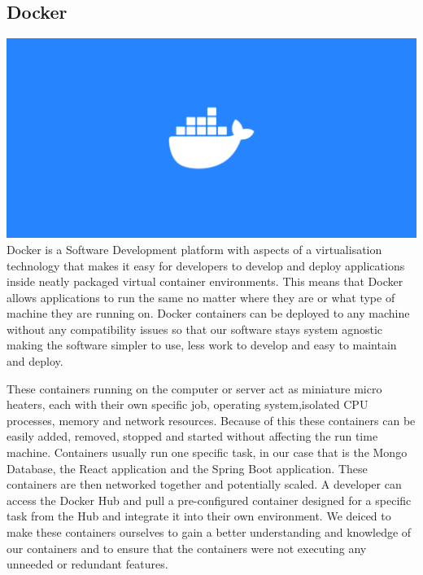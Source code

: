 \subsection{Docker}
\includegraphics[scale=0.2]{img/docker-logo.png} \newline
Docker is a Software Development platform with aspects of a virtualisation technology that makes it easy for developers to develop and deploy applications inside neatly packaged virtual container environments. This means that Docker allows applications to run the same no matter where they are or what type of machine they are running on. Docker containers can be deployed to any machine without any compatibility issues so that our software stays system agnostic making the software simpler to use, less work to develop and easy to maintain and deploy. \par
These containers running on the computer or server act as miniature micro heaters, each with their own specific job, operating system,isolated CPU processes, memory and network resources. Because of this these containers can be easily added, removed, stopped and started without affecting the run time machine. Containers usually run one specific task, in our case that is the Mongo Database, the React application and the Spring Boot application. These containers are then networked together and potentially scaled. A developer can access the Docker Hub and pull a pre-configured container designed for a specific task from the Hub and integrate it into their own environment. We deiced to make these containers ourselves to gain a better understanding and knowledge of our containers and to ensure that the containers were not executing any unneeded or redundant features.

